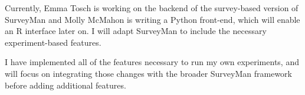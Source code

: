 

Currently, Emma Tosch is working on the backend of the survey-based version of SurveyMan and Molly McMahon is writing a Python front-end,
which will enable an R interface later on. I will adapt SurveyMan to include the necessary experiment-based
features.

I have implemented all of the features necessary to run my own experiments, and will focus on integrating
those changes with the broader SurveyMan framework before adding additional features.


